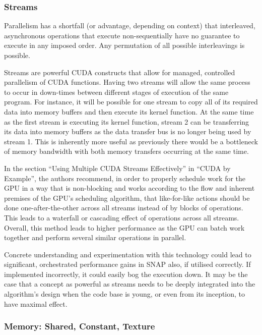 \documentclass[conference]{IEEEtran}
\begin{document}
\subsubsection{Streams}

Parallelism has a shortfall (or advantage, depending on context) that interleaved, asynchronous operations that execute non-sequentially have no guarantee to execute in any imposed order. Any permutation of all possible interleavings is possible.

Streams are powerful CUDA constructs that allow for managed, controlled parallelism of CUDA functions. Having two streams will allow the same process to occur in down-times between different stages of execution of the same program. For instance, it will be possible for one stream to copy all of its required data into memory buffers and then execute its kernel function. At the same time as the first stream is executing its kernel function, stream 2 can be transferring its data into memory buffers as the data transfer bus is no longer being used by stream 1. This is inherently more useful as previously there would be a bottleneck of memory bandwidth with both memory transfers occurring at the same time.

In the section ``Using Multiple CUDA Streams Effectively'' in ``CUDA by Example''\cite{sanders2010cuda}, the authors recommend, in order to properly schedule work for the GPU in a way that is non-blocking and works according to the flow and inherent premises of the GPU's scheduling algorithm, that like-for-like actions should be done one-after-the-other across all streams instead of by blocks of operations. This leads to a waterfall or cascading effect of operations across all streams. Overall, this method leads to higher performance as the GPU can batch work together and perform several similar operations in parallel.

Concrete understanding and experimentation with this technology could lead to significant, orchestrated performance gains in SNAP also, if utilised correctly. If implemented incorrectly, it could easily bog the execution down. It may be the case that a concept as powerful as streams needs to be deeply integrated into the algorithm's design when the code base is young, or even from its inception, to have maximal effect.


\subsubsection{Memory: Shared, Constant, Texture}
\end{document}
